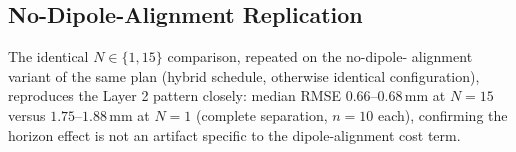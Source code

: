 \documentclass[11pt]{article}
\begin{document}
\subsection{No-Dipole-Alignment Replication}
\label{sec:ph-nodipole}

The identical $N\in\{1,15\}$ comparison, repeated on the no-dipole-
alignment variant of the same plan (hybrid schedule, otherwise
identical configuration), reproduces the Layer 2 pattern closely:
median RMSE $0.66$--$0.68\,\mathrm{mm}$ at $N{=}15$ versus
$1.75$--$1.88\,\mathrm{mm}$ at $N{=}1$ (complete separation, $n{=}10$
each), confirming the horizon effect is not an artifact specific to
the dipole-alignment cost term.
\end{document}
